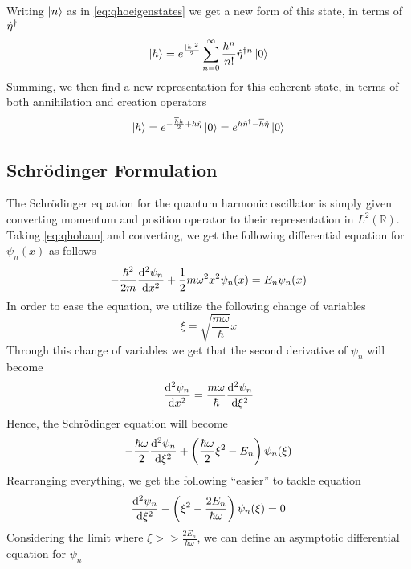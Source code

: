 \documentclass[../qm.tex]{subfiles}
\begin{document}
	Writing $\ket{n}$ as in \eqref{eq:qhoeigenstates} we get a new form of this state, in terms of $\hat{\eta}^{\dagger}$
	\begin{equation}
		\ket{h}=e^{\frac{\abs{h}^2}{2}}\sum_{n=0}^{\infty}\frac{h^n}{n!}\adj[n]{\opr{\eta}}\ket{0}
		\label{eq:adjeta}
	\end{equation}
	Summing, we then find a new representation for this coherent state, in terms of both annihilation and creation operators
	\begin{equation}
		\ket{h}=e^{-\frac{\overline{h}h}{2}+h\opr{\eta}}\ket{0}=e^{h\adj{\opr{\eta}}-\overline{h}\opr{\eta}}\ket{0}
		\label{eq:etadagetarepr}
	\end{equation}
	\subsection{Schrödinger Formulation}
	The Schrödinger equation for the quantum harmonic oscillator is simply given converting momentum and position operator to their representation in $L^2(\mathbb{R})$. Taking \eqref{eq:qhoham} and converting, we get the following differential equation for $\psi_n(x)$ as follows
	\begin{equation}
		-\frac{\hbar^2}{2m}\derivative[2]{\psi_n}{x}+\frac{1}{2}m\omega^2x^2\psi_n(x)=E_n\psi_n(x)
		\label{eq:qhoschreq}
	\end{equation}
	In order to ease the equation, we utilize the following change of variables
	\begin{equation*}
		\xi=\sqrt{\frac{m\omega}{\hbar}}x
	\end{equation*}
	Through this change of variables we get that the second derivative of $\psi_n$ will become
	\begin{equation*}
		\derivative[2]{\psi_n}{x}=\frac{m\omega}{\hbar}\derivative[2]{\psi_n}{\xi}
	\end{equation*}
	Hence, the Schrödinger equation will become
	\begin{equation*}
		-\frac{\hbar\omega}{2}\derivative[2]{\psi_n}{\xi}+\left( \frac{\hbar\omega}{2}\xi^2-E_n \right)\psi_n(\xi)
	\end{equation*}
	Rearranging everything, we get the following ``easier'' to tackle equation
	\begin{equation}
		\derivative[2]{\psi_n}{\xi}-\left( \xi^2-\frac{2E_n}{\hbar\omega} \right)\psi_n(\xi)=0
		\label{eq:finalschrqho}
	\end{equation}
	Considering the limit where $\xi>>\frac{2E_n}{\hbar\omega}$, we can define an asymptotic differential equation for $\psi_n$
\end{document}

